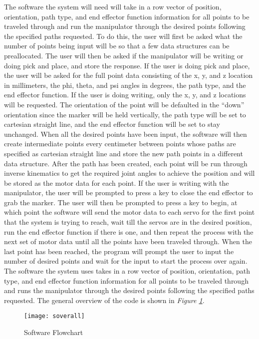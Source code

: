 The software the system will need will take in a row vector of position, orientation, path type, and end effector function information for all points to be traveled through and run the manipulator through the desired points following the specified paths requested. To do this, the user will first be asked what the number of points being input will be so that a few data structures can be preallocated. The user will then be asked if the manipulator will be writing or doing pick and place, and store the response. If the user is doing pick and place, the user will be asked for the full point data consisting of the x, y, and z location in millimeters, the phi, theta, and psi angles in degrees, the path type, and the end effector function. If the user is doing writing, only the x, y, and z locations will be requested. The orientation of the point will be defaulted in the “down” orientation since the marker will be held vertically, the path type will be set to cartesian straight line, and the end effector function will be set to stay unchanged. When all the desired points have been input, the software will then create intermediate points every centimeter between points whose paths are specified as cartesian straight line and store the new path points in a different data structure. After the path has been created, each point will be run through inverse kinematics to get the required joint angles to achieve the position and will be stored as the motor data for each point. If the user is writing with the manipulator, the user will be prompted to press a key to close the end effector to grab the marker. The user will then be prompted to press a key to begin, at which point the software will send the motor data to each servo for the first point that the system is trying to reach, wait till the servos are in the desired position, run the end effector function if there is one, and then repeat the process with the next set of motor data until all the points have been traveled through. When the last point has been reached, the program will prompt the user to input the number of desired points and wait for the input to start the process over again.
\captionsetup[sub]{
    labelformat=r-parens}
The software the system uses takes in a row vector of position, orientation, path type, and end effector function information for all points to be traveled through and runs the manipulator through the desired points following the specified paths requested. The general overview of the code is shown in \emph{Figure \ref{fig:soverall}}.

\begin{figure}[htp]
  \center
  \texttt{[image: soverall]}
  \caption{Software Flowchart}
  \label{fig:soverall}
\end{figure}

